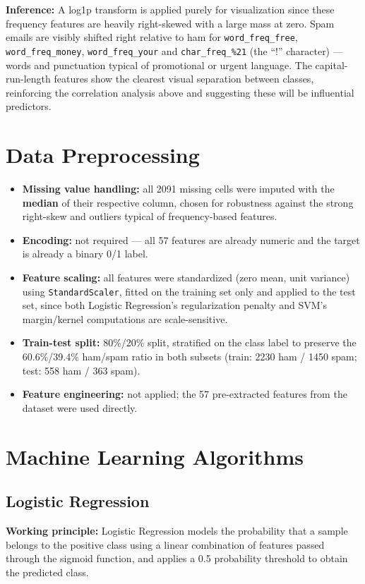 \documentclass[12pt,a4paper]{article}
\begin{document}
\textbf{Inference:} A log1p transform is applied purely for visualization since these frequency
features are heavily right-skewed with a large mass at zero. Spam emails are visibly shifted
right relative to ham for \texttt{word\_freq\_free}, \texttt{word\_freq\_money},
\texttt{word\_freq\_your} and \texttt{char\_freq\_\%21} (the ``!'' character) --- words and
punctuation typical of promotional or urgent language. The capital-run-length features show the
clearest visual separation between classes, reinforcing the correlation analysis above and
suggesting these will be influential predictors.

\section{Data Preprocessing}
\begin{itemize}
\item \textbf{Missing value handling:} all 2091 missing cells were imputed with the
\textbf{median} of their respective column, chosen for robustness against the strong right-skew
and outliers typical of frequency-based features.
\item \textbf{Encoding:} not required --- all 57 features are already numeric and the target is
already a binary 0/1 label.
\item \textbf{Feature scaling:} all features were standardized (zero mean, unit variance) using
\texttt{StandardScaler}, fitted on the training set only and applied to the test set, since both
Logistic Regression's regularization penalty and SVM's margin/kernel computations are
scale-sensitive.
\item \textbf{Train-test split:} 80\%/20\% split, stratified on the class label to preserve the
60.6\%/39.4\% ham/spam ratio in both subsets (train: 2230 ham / 1450 spam; test: 558 ham / 363
spam).
\item \textbf{Feature engineering:} not applied; the 57 pre-extracted features from the dataset
were used directly.
\end{itemize}

\section{Machine Learning Algorithms}

\subsection*{Logistic Regression}
\textbf{Working principle:} Logistic Regression models the probability that a sample belongs to
the positive class using a linear combination of features passed through the sigmoid function,
and applies a 0.5 probability threshold to obtain the predicted class.
\end{document}
